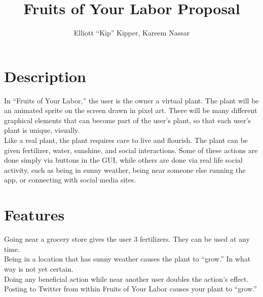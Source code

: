 \documentclass[12pt]{article}
\begin{document}
\title{Fruits of Your Labor Proposal}

\author{Elliott ``Kip'' Kipper, Kareem Nassar}

\maketitle

\section{Description}
In ``Fruits of Your Labor,'' the user is the owner a virtual plant.  The plant will be an animated sprite on the screen drawn in pixel art.  There will be many different graphical elements that can become part of the user's plant, so that each user's plant is unique, visually.
\\Like a real plant, the plant requires care to live and flourish.  The plant can be given fertilizer, water, sunshine, and social interactions.  Some of these actions are done simply via buttons in the GUI, while others are done via real life social activity, such as being in sunny weather, being near someone else running the app, or connecting with social media sites.

\section{Features}
Going near a grocery store gives the user 3 fertilizers.  They can be used at any time.
\\Being in a location that has sunny weather causes the plant to ``grow.''  In what way is not yet certain.
\\Doing any beneficial action while near another user doubles the action's effect.
\\Posting to Twitter from within Fruits of Your Labor causes your plant to ``grow.''
\end{document}
